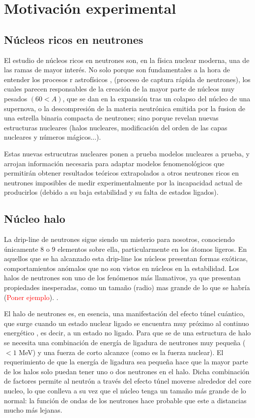\section{Motivación experimental}

\subsection{Núcleos ricos en neutrones}

El estudio de núcleos ricos en neutrones son, en la física nuclear moderna, una de las ramas de mayor interés. No solo porque son fundamentales a la hora de entender los procesos r astrofísicos \cite{THIELEMANN2011346}, (proceso de captura rápida de neutrones), los cuales parecen responsables de la creación de la mayor parte de núcleos muy pesados $(60<A)$, que se dan en la expansión tras un colapso del núcleo de una supernova, o la descompresión de la materia neutrónica emitida por la fusion de una estrella binaria compacta de neutrones; sino porque revelan nuevas estructuras nucleares (halos nucleares, modificación del orden de las capas nucleares y números mágicos...). 

Estas nuevas estrucutras nucleares ponen a prueba modelos nucleares a prueba, y arrojan información necesaria para adaptar modelos fenomenológicos que permitirán obtener resultados teóricos extrapolados a otros neutrones ricos en neutrones imposibles de medir experimentalmente por la incapacidad actual de producirlos (debido a su baja estabilidad y su falta de estados ligados).



\subsection{Núcleo halo}

La drip-line de neutrones sigue siendo un misterio para nosotros, conociendo únicamente 8 o 9 elementos sobre ella, particularmente en los átomos ligeros. En aquellos que se ha alcanzado esta drip-line los núcleos presentan formas exóticas, comportamientos anómalos que no son vistos en núcleos en la estabilidad. Los halos de neutrones son uno de los fenómenos más llamativos, ya que presentan propiedades inesperadas, como un tamaño (radio) mas grande de lo que se habría (\textcolor{red}{{{Poner ejemplo}}}). \cite{tanihata2023halo}.

El halo de neutrones es, en esencia, una manifestación del efecto túnel cuántico, que surge cuando un estado nuclear ligado se encuentra muy próximo al continuo energético  \cite{tanihata2023halo}, es decir, a un estado no ligado. Para que se de una estructura de halo se necesita una combinación de energía de ligadura de neutrones muy pequeña  ($<1$ MeV) y una fuerza de corto alcanzce (como es la fuerza nuclear). El requerimiento de que la energía de ligadura sea pequeña hace que la mayor parte de los halos solo puedan tener uno o dos neutrones en el halo. Dicha combinación de factores permite al neutrón a través del efecto túnel moverse alrededor del core nucleo, lo que conlleva a su vez que el núcleo tenga un tamaño más grande de lo normal: la función de ondas de los neutrones hace probable que este a distancias mucho más lejanas. 

